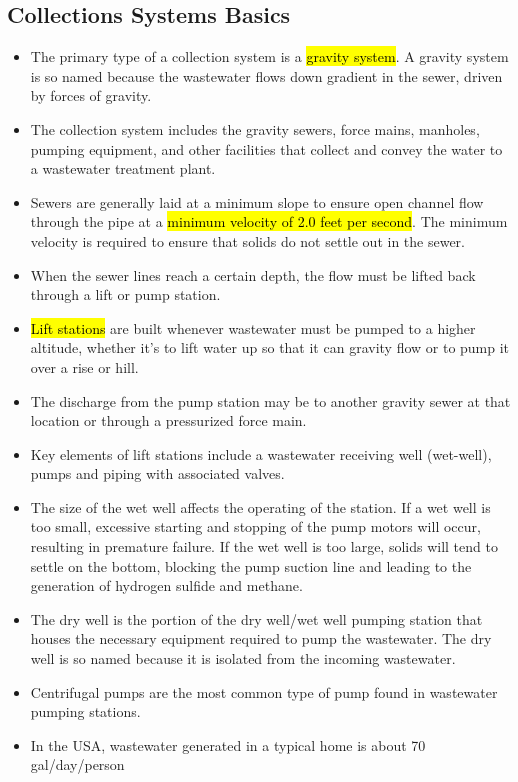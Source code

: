 \documentclass{article}
\begin{document}
\subsection{Collections Systems Basics}
	\begin{itemize}
\item The primary type of a collection system is a \hl{gravity system}. A gravity system is so named because the wastewater flows down gradient in the sewer, driven by forces of gravity. 
\item The collection system includes the gravity sewers, force mains, manholes, pumping equipment, and other facilities that collect and convey the water to a wastewater treatment plant. 
\item Sewers are generally laid at a minimum slope to ensure open channel flow through the pipe at a \hl{minimum velocity of 2.0 feet per second}. The minimum velocity is required to ensure that solids do not settle out in the sewer.  
\item When the sewer lines reach a certain depth, the flow must be lifted back through a lift or pump station.  
\item \hl{Lift stations} are built whenever wastewater must be pumped to a higher altitude, whether it's to lift water up so that it can gravity flow or to pump it over a rise or hill.  
\item The discharge from the pump station may be to another gravity sewer at that location or through a pressurized force main. 
\item Key elements of lift stations include a wastewater receiving well (wet-well), pumps and piping with associated valves.
\item The size of the wet well affects the operating of the station. If a wet well is too small, excessive starting and stopping of the pump motors will occur, resulting in premature failure. If the wet well is too large, solids will tend to settle on the bottom, blocking the pump suction line and leading to the generation of hydrogen sulfide and methane.
\item The dry well is the portion of the dry well/wet well pumping station that houses the necessary equipment required to pump the wastewater. The dry well is so named because it is isolated from the incoming wastewater.
\item Centrifugal pumps are the most common type of pump found in wastewater pumping stations. 
\item In the USA, wastewater generated in a typical home is about 70 gal/day/person
\end{itemize}
\end{document}
